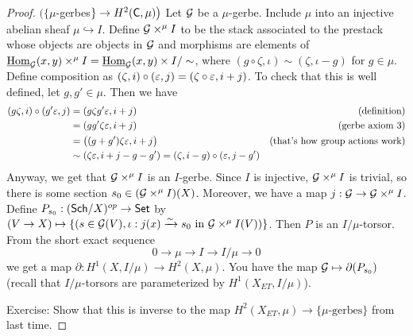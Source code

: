 \begin{proof}
 \medskip
 $\bigl(\{\mu$-gerbes$\}\to H^2(\text{\sf C},\mu)\bigr)$ Let $\mathcal{G}$ be a $\mu$-gerbe. Include $\mu$ into an injective abelian sheaf $\mu\hookrightarrow I$. Define $\mathcal{G}\times^\mu I$ to be the stack associated to the prestack whose objects are objects in $\mathcal{G}$ and morphisms are elements of $\operatorname{\underline{Hom}}_{\mathcal{G}}(x,y)\times^\mu I=\operatorname{\underline{Hom}}_{\mathcal{G}}(x,y)\times I/\sim$, where $(g\circ\zeta,\iota)\sim (\zeta,\iota-g)$ for $g\in \mu$. Define composition as $(\zeta,i)\circ (\varepsilon,j)=(\zeta\circ \varepsilon,i+j)$. To check that this is well defined, let $g, g'\in \mu$. Then we have
 \begin{align*}
  (g \zeta, i)\circ (g'\varepsilon,j)&=(g\zeta g'\varepsilon,i+j) &\text{(definition)}\\
  &=(gg'\zeta\varepsilon,i+j) & \text{(gerbe axiom 3)}\\
  &=\bigl((g+g')\zeta\varepsilon,i+j\bigr) &\text{(that's how group actions work)}\\
  &\sim (\zeta\varepsilon,i+j-g-g') = (\zeta,i-g)\circ (\varepsilon,j-g')
 \end{align*}
 Anyway, we get that $\mathcal{G}\times^\mu I$ is an $I$-gerbe. Since $I$ is injective, $\mathcal{G}\times^\mu I$ is trivial, so there is some section $s_0\in (\mathcal{G}\times^\mu I)(X)$. Moreover, we have a map $j:\mathcal{G}\to \mathcal{G}\times^\mu I$. Define $P_{s_0}:(\text{\sf Sch}/X)^{op}\to \text{\sf Set}$ by $(V\to X)\mapsto \{(s\in \mathcal{G}(V),\iota:j(x)\xrightarrow\sim s_0\text{ in } \mathcal{G}\times^\mu I(V))\}$. Then $P$ is an $I/\mu$-torsor. From the short exact sequence
 \[
  0\to \mu\to I\to I/\mu\to 0
 \]
 we get a map $\partial:H^1(X,I/\mu)\to H^2(X,\mu)$. You have the map $\mathcal{G}\mapsto \partial(P_{s_0})$ (recall that $I/\mu$-torsors are parameterized by $H^1(X_{ET},I/\mu)$).

 Exercise: Show that this is inverse to the map $H^2(X_{ET},\mu)\to \{\mu\text{-gerbes}\}$ from last time. \anton{}
\end{proof}

